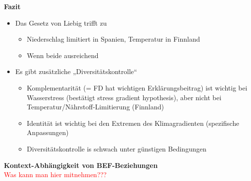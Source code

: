 \textbf{Fazit}
\begin{itemize}
	\item Das Gesetz von Liebig trifft zu
	\begin{itemize}
		\item Niederschlag limitiert in Spanien, Temperatur in Finnland
		\item Wenn beide ausreichend
	\end{itemize}
	\item Es gibt zusätzliche „Diversitätskontrolle“
	\begin{itemize}
		\item Komplementarität (= FD hat wichtigen Erklärungsbeitrag) ist wichtig bei Wasserstress (bestätigt stress gradient hypothesis), aber nicht bei Temperatur/Nährstoff-Limitierung (Finnland)
		\item Identität ist wichtig bei den Extremen des Klimagradienten (spezifische Anpassungen)
		\item Diversitätskontrolle is schwach unter günstigen Bedingungen
	\end{itemize}
\end{itemize}

\textbf{Kontext-Abhängigkeit von BEF-Beziehungen}\\
\textcolor{red}{Was kann man hier mitnehmen???}
